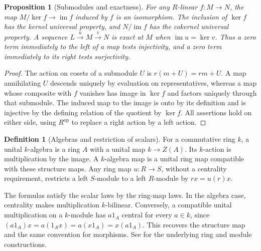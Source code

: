 \documentclass[11pt,oneside,openany]{book}
\newtheorem{proposition}[theorem]{Proposition}
\theoremstyle{definition}
\newtheorem{definition}[theorem]{Definition}
\theoremstyle{remark}
\begin{document}
\begin{proposition}[Submodules and exactness]\label{p103:ALG-03-C01-R02}
For any \(R\)-linear \(f:M\to N\), the map \(M/\ker f\to
\operatorname{im}f\) induced by \(f\) is an isomorphism.
The inclusion of \(\ker f\) has the kernel universal property, and
\(N/\operatorname{im}f\) has the cokernel universal property.
A sequence \(L\xrightarrow{u}M\xrightarrow{v}N\) is exact at \(M\)
when \(\operatorname{im}u=\ker v\). Thus a zero term immediately to
the left of a map tests injectivity, and a zero term immediately to
its right tests surjectivity.
\end{proposition}
\begin{proof}
The action on cosets of a submodule \(U\) is \(r(m+U)=rm+U\).
A map annihilating \(U\) descends uniquely by evaluation on
representatives, whereas a map whose composite with \(f\) vanishes
has image in \(\ker f\) and factors uniquely through that submodule.
The induced map to the image is onto by its definition and is
injective by the defining relation of the quotient by \(\ker f\).
All assertions hold on either side, using \(R^{\mathrm{op}}\) to
replace a right action by a left action.
\end{proof}

\begin{definition}[Algebras and restriction of scalars]\label{p103:ALG-03-C01-R03}
For a commutative ring \(k\), a unital \(k\)-algebra is a ring \(A\)
with a unital map \(k\to Z(A)\). Its \(k\)-action is multiplication
by the image. A \(k\)-algebra map is a unital ring map compatible
with these structure maps. Any ring map \(u:R\to S\), without a
centrality requirement, restricts a left \(S\)-module to a left
\(R\)-module by \(rx=u(r)x\).
\end{definition}
The formulas satisfy the scalar laws by the ring-map laws. In the
algebra case, centrality makes multiplication \(k\)-bilinear.
Conversely, a compatible unital multiplication on a \(k\)-module
has \(a1_A\) central for every \(a\in k\), since
\((a1_A)x=a(1_Ax)=a(x1_A)=x(a1_A)\). This recovers the structure
map and the same convention for morphisms. See \cite[Sections 7.2,
7.3, and 10.1--10.2]{dummit} for the underlying ring and module
constructions.
\end{document}
